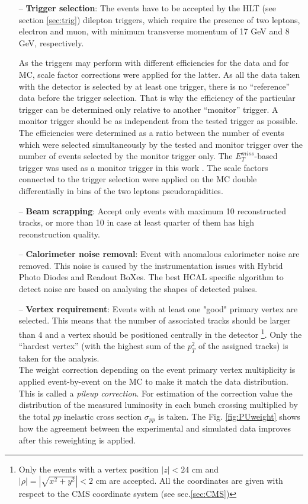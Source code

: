 \begin{itemize}
 \item [--] \textbf{Trigger selection}: The events have to be accepted by the HLT (see section \ref{sec:trig}) dilepton triggers, which require the presence of two leptons, electron and muon, with
 minimum transverse momentum of 17 GeV and 8 GeV, respectively.
 
 As the triggers may perform with different efficiencies for the data and for MC, scale factor corrections were applied for the latter. As all the data taken with 
 the detector is selected by at least one trigger, there is no ``reference'' data before the trigger selection. That is why the efficiency of the particular trigger 
 can be determined only relative to another ``monitor'' trigger. A monitor trigger should be as independent from the tested trigger as possible. The efficiencies
 were determined as a ratio between the number of events which were selected simultaneously by the tested and monitor trigger over the number of events selected by
 the monitor trigger only. The $E_{T}^{miss}$-based trigger was used as a monitor trigger in this work \cite{Asin2014Auth}. The scale factors connected 
 to the trigger selection were applied on the MC double differentially in bins of the two leptons pseudorapidities. 
 \item [--] \textbf{Beam scrapping}: Accept only events with maximum 10 reconstructed tracks, or more than 10 in case at least quarter of them has high reconstruction 
 quality.
 \item [--] \textbf{Calorimeter noise removal}: Event with anomalous calorimeter noise are removed\cite{HCALNoise}. This noise is caused by the instrumentation issues with Hybrid 
 Photo Diodes and Readout BoXes. The best HCAL specific algorithm to detect noise are based on analysing the shapes of detected pulses.
 \item [--] \textbf{Vertex requirement}: Events with at least one "good" primary vertex are selected.
 This means that the number of associated tracks should be larger than 4 and a vertex should be positioned centrally in the detector
 \footnote{Only the events with a vertex position $|z| < \textrm{24 cm}$ and $|\rho| = |\sqrt{x^{2} + y^{2}}| < \textrm{2 cm}$ are accepted. All the coordinates
 are given with respect to the CMS coordinate system (see sec.\ref{sec:CMS})}. Only the ``hardest vertex'' 
 (with the highest sum of the $p_{T}^{2}$ of the assigned tracks) is taken for the analysis. 
 \\
 The weight correction depending on the event primary vertex multiplicity is applied
 event-by-event on the MC to make it match the data distribution. This is called a \textit{pileup correction}. For estimation of the correction value
 the distribution of the measured luminosity in each bunch crossing \cite{CMS:2012rua}
 multiplied by the total $pp$ inelastic cross section $\sigma_{pp}$ \cite{TWikiSystPU} is taken.
 The Fig. \ref{fig:PUweight} shows how the agreement
 between the experimental and simulated data improves after this reweighting is applied.
 

\end{itemize}
